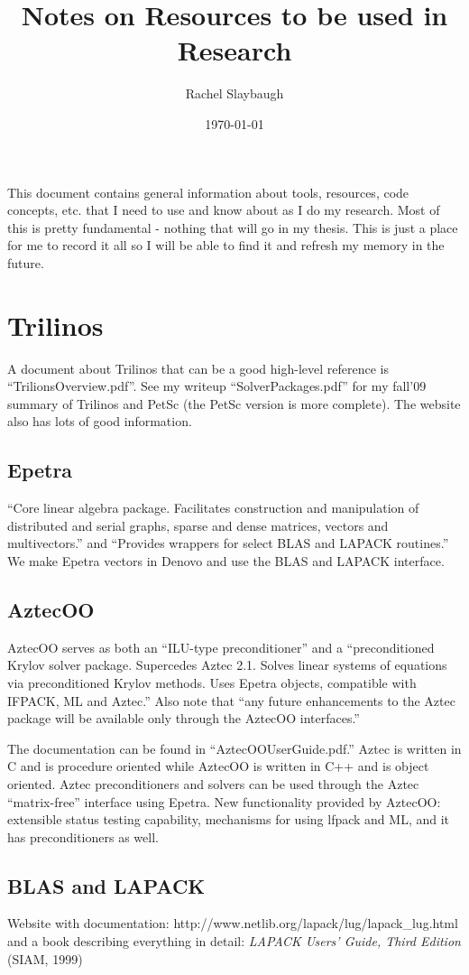 \documentclass[12pt,twoside]{article}
\date{\today}
\title{Notes on Resources to be used in Research}
\author{Rachel Slaybaugh}
\begin{document}
\maketitle

This document contains general information about tools, resources, code concepts, etc. that I need to use and know about as I do my research. Most of this is pretty fundamental - nothing that will go in my thesis. This is just a place for me to record it all so I will be able to find it and refresh my memory in the future. 
\section{Trilinos}
A document about Trilinos that can be a good high-level reference is ``TrilionsOverview.pdf''. See my writeup ``SolverPackages.pdf'' for my fall'09 summary of Trilinos and PetSc (the PetSc version is more complete). The website also has lots of good information. 
\subsection{Epetra}
``Core linear algebra package. Facilitates construction and manipulation of distributed and serial graphs, sparse and dense matrices, vectors and multivectors.'' and ``Provides wrappers for select BLAS and LAPACK routines.'' We make Epetra vectors in Denovo and use the BLAS and LAPACK interface. 

\subsection{AztecOO}
AztecOO serves as both an ``ILU-type preconditioner'' and a ``preconditioned Krylov solver package. Supercedes Aztec 2.1. Solves linear systems of equations via preconditioned Krylov methods. Uses Epetra objects, compatible with IFPACK, ML and Aztec.'' Also note that ``any future enhancements to the Aztec package will be available only through the AztecOO interfaces.''

The documentation can be found in ``AztecOOUserGuide.pdf.'' Aztec is written in C and is procedure oriented while AztecOO is written in C++ and is object oriented. Aztec preconditioners and solvers can be used through the Aztec ``matrix-free'' interface using Epetra. New functionality provided by AztecOO: extensible status testing capability, mechanisms for using lfpack and ML, and it has preconditioners as well. 

\subsection{BLAS and LAPACK}
Website with documentation: http://www.netlib.org/lapack/lug/lapack\_lug.html and a book describing everything in detail: \emph{LAPACK Users' Guide, Third Edition} (SIAM, 1999)
\end{document}
